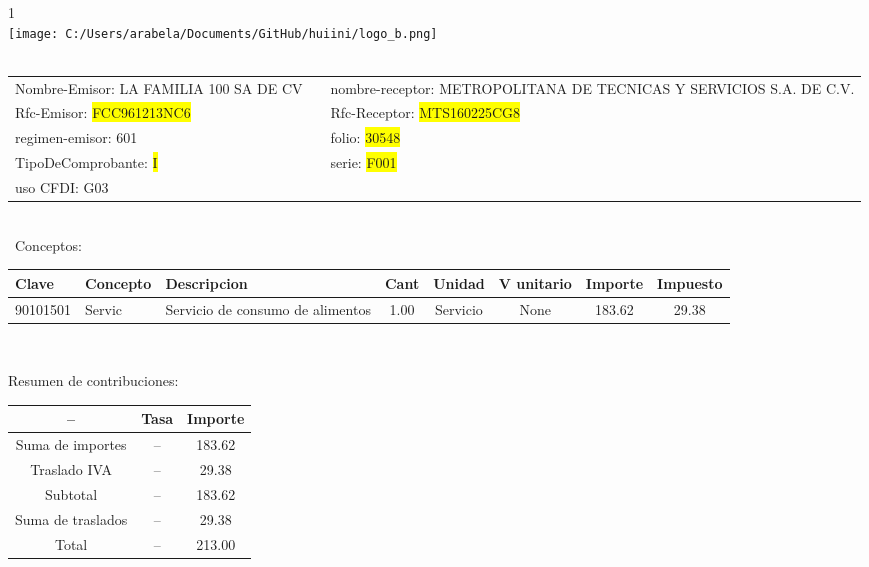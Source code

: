 \documentclass{article}
\begin{document}
\hspace{18cm} 1\\
\texttt{[image: C:/Users/arabela/Documents/GitHub/huiini/logo\_b.png]}
\bigskip\\\
\begin{tabular}{p{11cm}p{1cm}p{8cm}}

Nombre-Emisor: LA FAMILIA 100  SA DE CV && nombre-receptor: METROPOLITANA DE TECNICAS Y SERVICIOS S.A. DE C.V.\\

Rfc-Emisor: \colorbox{yellow}{ FCC961213NC6 } & & Rfc-Receptor: \colorbox{yellow}{ MTS160225CG8 }\\

regimen-emisor: 601 & & folio: \colorbox{yellow}{ 30548 }\\

TipoDeComprobante: \colorbox{yellow}{ I } & & serie: \colorbox{yellow}{ F001 }\\

uso CFDI: G03\\



\end{tabular}
\bigskip\bigskip\bigskip\\\
Conceptos:\\
\begin{tabular}{|p{1.5cm}|p{3.6cm}|p{3.6cm}|c|c|c|c|c|}
\hline
Clave & Concepto & Descripcion & Cant & Unidad & V unitario & Importe & Impuesto \\
\hline

90101501 & Servic & Servicio de consumo de alimentos & 1.00 & Servicio & None & 183.62 &  29.38 \\
\hline

\end{tabular}\\
\bigskip
\begin{center}
Resumen de contribuciones:\\
\bigskip
\begin{tabular}{|c|c|c|}
\hline
 -- & Tasa & Importe\\
\hline

Suma de importes & -- & 183.62 \\
\hline

Traslado IVA & -- & 29.38 \\
\hline

Subtotal  & -- & 183.62 \\
\hline

Suma de traslados & -- & 29.38 \\
\hline

Total  & -- & 213.00 \\
\hline

\end{tabular}
\end{center}
\end{document}
